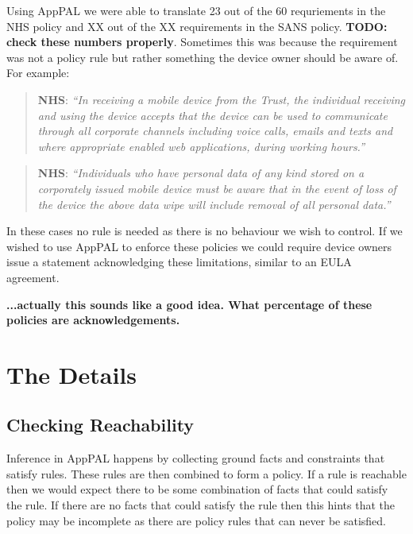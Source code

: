 \documentclass[a4paper]{article}
\begin{document}
Using AppPAL we were able to translate 23 out of the 60 requriements in the NHS policy and XX out of the XX requirements in the SANS policy. \textbf{\large TODO: check these numbers properly}.  Sometimes this was because the requirement was not a policy rule but rather something the device owner should be aware of.  For example:

\begin{quote}\footnotesize
  \textbf{NHS}: \itshape 
``In receiving a mobile device from the Trust, the individual receiving and using
the device accepts that the device can be used to communicate through all
corporate channels including voice calls, emails and texts and where appropriate
enabled web applications, during working hours.''
\end{quote}

\begin{quote}\footnotesize
  \textbf{NHS}: \itshape 
``Individuals who have personal data of any kind stored on a corporately issued
mobile device must be aware that in the event of loss of the device the above
data wipe will include removal of all personal data.''
\end{quote}

In these cases no rule is needed as there is no behaviour we wish to control. 
If we wished to use AppPAL to enforce these policies we could require device owners issue a statement acknowledging these limitations, similar to an EULA agreement.

{\large \textbf{...actually this sounds like a good idea.  What percentage of these policies are acknowledgements.}}

\section{The Details}
\label{sec:details}


\newcommand{\facts}[1]{\ensuremath \textsf{facts}\left(#1\right)}
\newcommand{\reachable}[2]{\ensuremath \textsf{reachable}\left(#1,~#2\right)}
\subsection{Checking Reachability}

Inference in AppPAL happens by collecting ground facts and constraints that satisfy rules. 
These rules are then combined to form a policy.
If a rule is reachable then we would expect there to be some combination of facts that could satisfy the rule.
If there are no facts that could satisfy the rule then this hints that the policy may be incomplete as there are policy rules that can never be satisfied.  
\end{document}
